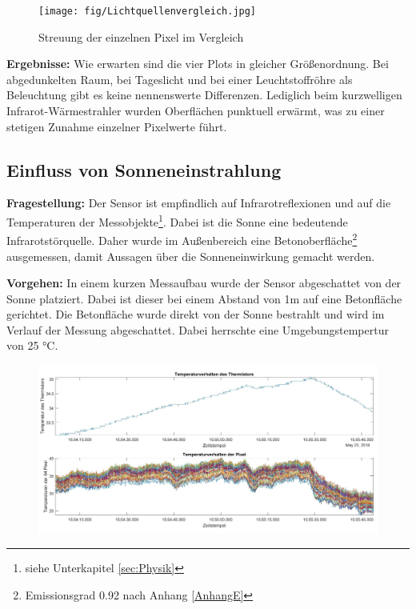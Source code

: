 \begin{figure}[H]
	\centering
	\texttt{[image: fig/Lichtquellenvergleich.jpg]}
	\caption[Streuung der einzelnen Pixel im Vergleich]{Streuung der einzelnen Pixel im Vergleich}
	\label{fig:Streuung}
\end{figure}

\textbf{Ergebnisse:}  Wie erwarten sind die vier Plots in gleicher Größenordnung. Bei abgedunkelten Raum, bei Tageslicht und bei einer Leuchtstoffröhre als Beleuchtung gibt es keine nennenswerte Differenzen. Lediglich beim kurzwelligen Infrarot-Wärmestrahler wurden Oberflächen punktuell erwärmt, was zu einer stetigen Zunahme einzelner Pixelwerte führt. 

\subsection{Einfluss von  Sonneneinstrahlung}

\textbf{Fragestellung:} Der Sensor ist empfindlich auf Infrarotreflexionen und auf die Temperaturen der Messobjekte\footnote[16]{siehe Unterkapitel  \ref{sec:Physik}}. Dabei ist die Sonne eine bedeutende Infrarotstörquelle. Daher wurde im Außenbereich eine Betonoberfläche\footnote[17]{Emissionsgrad 0.92 nach Anhang \ref{AnhangE}} ausgemessen, damit Aussagen über die Sonneneinwirkung gemacht werden. 

\textbf{Vorgehen:} In einem kurzen Messaufbau wurde der Sensor abgeschattet von der Sonne platziert. Dabei ist dieser bei einem Abstand von 1m auf eine Betonfläche gerichtet. Die Betonfläche wurde direkt von der Sonne bestrahlt und wird im Verlauf der Messung abgeschattet. Dabei herrschte eine Umgebungstempertur von 25 °C.  


\begin{figure}[H]
	\centering
	\includegraphics[width=1.0\textwidth]{fig/Temperaturverhalten2}
	\caption{}
	\label{fig:temperaturverhalten2}
\end{figure}

